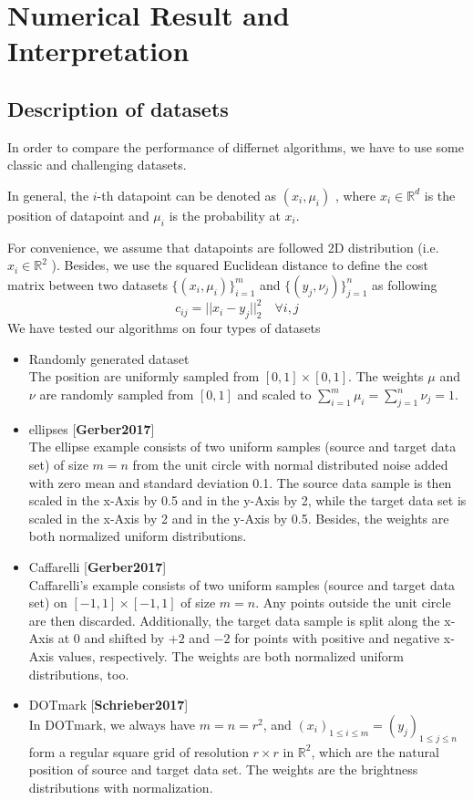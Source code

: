 \documentclass{article}
\begin{document}
\section{Numerical Result and Interpretation}
\subsection{Description of datasets}
In order to compare the performance of differnet algorithms, we have to use some classic and challenging datasets.

In general, the $i$-th datapoint can be denoted as $(x_{i},\mu_{i})$ , where $x_{i}\in \mathbb{R}^{d}$ is the position of datapoint and $\mu_{i}$ is the probability at $x_{i}$.

For convenience, we assume that datapoints are followed 2D distribution (i.e. $x_{i}\in \mathbb{R}^{2}$ ). Besides, we use the squared Euclidean distance to define the cost matrix between two datasets $\{(x_{i},\mu_{i})\}_{i=1}^{m}$ and $\{(y_{j},\nu_{j})\}_{j=1}^{n}$ as following
\begin{equation}
  c_{ij}=||x_{i}-y_{j}||_{2}^{2}\quad\forall i, j
\end{equation}
We have tested our algorithms on four types of datasets
\begin{itemize}
  \item Randomly generated dataset\\
        The position are uniformly sampled from
        $[0, 1]\times[0, 1]$. The weights $\mu$ and $\nu$ are randomly sampled from $[0, 1]$ and scaled to $ \sum_{i=1}^{m}{\mu_i} = \sum_{j=1}^{n}{\nu_j} = 1 $.
  \item ellipses [\textbf{Gerber2017}]\\
  The ellipse example consists of two uniform samples (source and target data set) of size $m=n$ from the unit circle
  with normal distributed noise added with zero mean and standard deviation 0.1. The source
  data sample is then scaled in the x-Axis by 0.5 and in the y-Axis by 2, while the target
  data set is scaled in the x-Axis by 2 and in the y-Axis by 0.5.
  Besides, the weights are both normalized uniform distributions.
  \item Caffarelli [\textbf{Gerber2017}]\\
  Caffarelli’s example consists of two uniform samples (source and target data set) on $[-1, 1]\times[-1, 1]$  of size $m=n$. Any points outside the unit circle are then
discarded. Additionally, the target data sample is split along the x-Axis at 0 and shifted by
$+2$ and $-2$ for points with positive and negative x-Axis values, respectively. The weights are both normalized uniform distributions, too.
  \item DOTmark [\textbf{Schrieber2017}]\\
  In DOTmark, we always have $m=n=r^{2}$, and $(x_i)_{1\leq i\leq m} = (y_j)_{1\leq j\leq n}$ form a regular square grid of resolution $r\times r$ in $\mathbb{R}^{2}$, which are the natural position of source and target data set. The weights are the brightness distributions with normalization.
\end{itemize}
\end{document}

